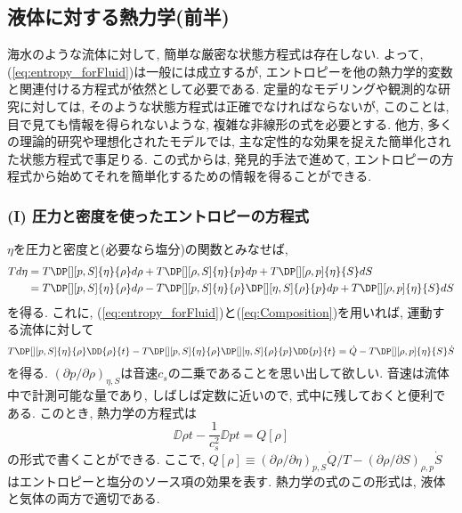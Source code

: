 \subsection{液体に対する熱力学(前半)}
海水のような流体に対して, 簡単な厳密な状態方程式は存在しない. 
よって, (\ref{eq:entropy_forFluid})は一般には成立するが, 
エントロピーを他の熱力学的変数と関連付ける方程式が依然として必要である. 
定量的なモデリングや観測的な研究に対しては, そのような状態方程式は正確でなければならないが, 
このことは, 目で見ても情報を得られないような, 複雑な非線形の式を必要とする. 
他方, 多くの理論的研究や理想化されたモデルでは, 主な定性的な効果を捉えた簡単化された状態方程式で事足りる. 
この式からは, 発見的手法で進めて, エントロピーの方程式から始めてそれを簡単化するための情報を得ることができる. 

\subsubsection*{(I) 圧力と密度を使ったエントロピーの方程式}
$\eta$を圧力と密度と(必要なら塩分)の関数とみなせば, 
\begin{equation}
\begin{split}
 Td\eta 
 &= T \DP[][p,S]{\eta}{\rho} d\rho + T \DP[][\rho,S]{\eta}{p} dp + T \DP[][\rho,p]{\eta}{S} dS \\
 &= T \DP[][p,S]{\eta}{\rho} d\rho - T \DP[][p,S]{\eta}{\rho} \DP[][\eta,S]{\rho}{p} dp + T \DP[][\rho,p]{\eta}{S} dS 
\end{split}
\end{equation}
を得る. 
これに, (\ref{eq:entropy_forFluid})と(\ref{eq:Composition})を用いれば, 
運動する流体に対して
\begin{equation}
   T \DP[][p,S]{\eta}{\rho} \DD{\rho}{t} - T \DP[][p,S]{\eta}{\rho} \DP[][\eta,S]{\rho}{p} \DD{p}{t} 
 = \dot{Q} - T \DP[][\rho,p]{\eta}{S} \dot{S}
\end{equation}
を得る. 
$(\partial p/\partial \rho)_{\eta,S}$は音速$c_s$の二乗であることを思い出して欲しい. 
音速は流体中で計測可能な量であり, しばしば定数に近いので, 式中に残しておくと便利である. 
このとき, 熱力学の方程式は
\begin{equation}
 \boxed{
 \DD{\rho}{t} - \dfrac{1}{c_s^2} \DD{p}{t} = Q[\rho]
\label{eq:entropyEq_withDens,P}
 }
\end{equation}
の形式で書くことができる. 
ここで, 
$Q[\rho] \equiv (\partial \rho/\partial \eta)_{p,S} \dot{Q}/T - (\partial \rho/\partial S)_{\rho,p} \dot{S}$
はエントロピーと塩分のソース項の効果を表す. 
熱力学の式のこの形式は, 液体と気体の両方で適切である. 

